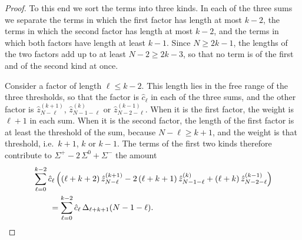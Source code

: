\documentclass{amsart}
\theoremstyle{definition}
\theoremstyle{remark}
\numberwithin{equation}{section}
\begin{document}
\begin{proof}
To this end we sort the terms into three kinds. In each of the three sums we separate the terms in which the first factor has length at most $k-2$, the terms in which the second factor has length at most $k-2$, and the terms in which both factors have length at least $k-1$. Since $N\ge 2k-1$, the lengths of the two factors add up to at least $N-2\ge 2k-3$, so that no term is of the first and of the second kind at once.

Consider a factor of length $\ell\le k-2$. This length lies in the free range of the three thresholds, so that the factor is $\hat c_\ell$ in each of the three sums, and the other factor is $\hat z^{(k+1)}_{N-\ell}$, $\hat z^{(k)}_{N-1-\ell}$ or $\hat z^{(k-1)}_{N-2-\ell}$. When it is the first factor, the weight is $\ell+1$ in each sum. When it is the second factor, the length of the first factor is at least the threshold of the sum, because $N-\ell\ge k+1$, and the weight is that threshold, i.e.\ $k+1$, $k$ or $k-1$. The terms of the first two kinds therefore contribute to $\Sigma^{+}-2\,\Sigma^{0}+\Sigma^{-}$ the amount
\begin{align*}
&\sum_{\ell=0}^{k-2}\hat c_\ell\,\Bigl((\ell+k+2)\,\hat z^{(k+1)}_{N-\ell}-2\,(\ell+k+1)\,\hat z^{(k)}_{N-1-\ell}+(\ell+k)\,\hat z^{(k-1)}_{N-2-\ell}\Bigr)\\
&\qquad=\sum_{\ell=0}^{k-2}\hat c_\ell\,\Delta_{\ell+k+1}(N-1-\ell).
\end{align*}


\end{proof}
\end{document}

